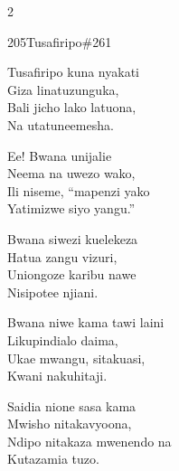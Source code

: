 \begin{multicols}{2}
\begin{hymn}{205}{Tusafiripo}{\#261}
\begin{stanza}
Tusafiripo kuna nyakati\\
Giza linatuzunguka,\\
Bali jicho lako latuona,\\
Na utatuneemesha.
\end{stanza}
\begin{chorus}
Ee! Bwana unijalie\\
Neema na uwezo wako,\\
Ili niseme, ``mapenzi yako\\
Yatimizwe siyo yangu.''
\end{chorus}
\begin{stanza}
Bwana siwezi kuelekeza\\
Hatua zangu vizuri,\\
Uniongoze karibu nawe\\
Nisipotee njiani.
\end{stanza}
\begin{stanza}
Bwana niwe kama tawi laini\\
Likupindialo daima,\\
Ukae mwangu, sitakuasi,\\
Kwani nakuhitaji.
\end{stanza}
\begin{stanza}
Saidia nione sasa kama\\
Mwisho nitakavyoona,\\
Ndipo nitakaza mwenendo na\\
Kutazamia tuzo.
\end{stanza}
\end{hymn}


\end{multicols}
